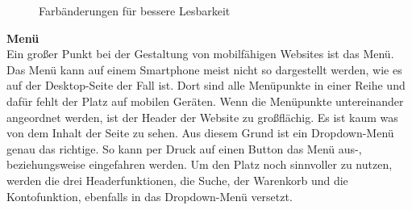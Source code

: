 \begin{figure}[H]
\begin{center}
\caption{Farbänderungen für bessere Lesbarkeit}
\end{center}
\end{figure}
\textbf{Menü}
\\
Ein großer Punkt bei der Gestaltung von mobilfähigen Websites ist das Menü. Das Menü kann auf einem Smartphone meist nicht so dargestellt werden, wie es auf der Desktop-Seite der Fall ist. Dort sind alle Menüpunkte in einer Reihe und dafür fehlt der Platz auf mobilen Geräten. Wenn die Menüpunkte untereinander angeordnet werden, ist der Header der Website zu großflächig. Es ist kaum was von dem Inhalt der Seite zu sehen. Aus diesem Grund ist ein Dropdown-Menü genau das richtige. So kann per Druck auf einen Button das Menü aus-, beziehungsweise eingefahren werden. Um den Platz noch sinnvoller zu nutzen, werden die drei Headerfunktionen, die Suche, der Warenkorb und die Kontofunktion, ebenfalls in das Dropdown-Menü versetzt.


